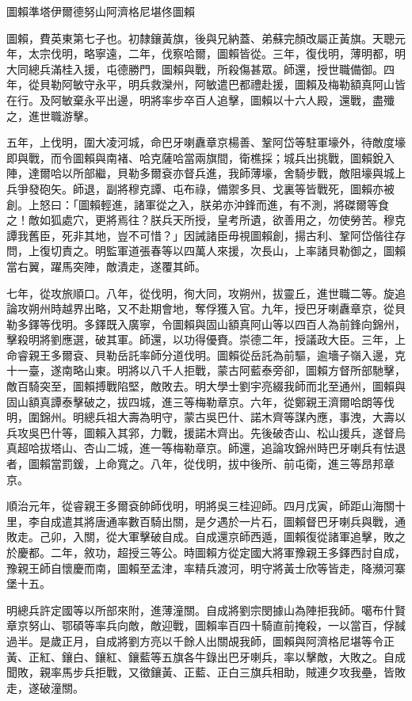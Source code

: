 
\begin{pinyinscope}
圖賴準塔伊爾德努山阿濟格尼堪佟圖賴

圖賴，費英東第七子也。初隸鑲黃旗，後與兄納蓋、弟蘇完顏改屬正黃旗。天聰元年，太宗伐明，略寧遠，二年，伐察哈爾，圖賴皆從。三年，復伐明，薄明都，明大同總兵滿桂入援，屯德勝門，圖賴與戰，所殺傷甚眾。師還，授世職備御。四年，從貝勒阿敏守永平，明兵救灤州，阿敏遣巴都禮赴援，圖賴及梅勒額真阿山皆在行。及阿敏棄永平出邊，明將率步卒百人追擊，圖賴以十六人殿，還戰，盡殲之，進世職游擊。

五年，上伐明，圍大凌河城，命巴牙喇纛章京楊善、鞏阿岱等駐軍壕外，待敵度壕即與戰，而令圖賴與南褚、哈克薩哈當兩旗間，衛樵採；城兵出挑戰，圖賴銳入陣，達爾哈以所部繼，貝勒多爾袞亦督兵進，我師薄壕，舍騎步戰，敵阻壕與城上兵爭發砲矢。師退，副將穆克譚、屯布祿，備禦多貝、戈裏等皆戰死，圖賴亦被創。上怒曰：「圖賴輕進，諸軍從之入，朕弟亦沖鋒而進，有不測，將磔爾等食之！敵如狐處穴，更將焉往？朕兵天所授，皇考所遺，欲善用之，勿使勞苦。穆克譚我舊臣，死非其地，豈不可惜？」因誡諸臣毋視圖賴創，揚古利、鞏阿岱偕往存問，上復切責之。明監軍道張春等以四萬人來援，次長山，上率諸貝勒御之，圖賴當右翼，躍馬突陣，敵潰走，遂覆其師。

七年，從攻旅順口。八年，從伐明，徇大同，攻朔州，拔靈丘，進世職二等。旋追論攻朔州時越界出略，又不赴期會地，奪俘獲入官。九年，授巴牙喇纛章京，從貝勒多鐸等伐明。多鐸既入廣寧，令圖賴與固山額真阿山等以四百人為前鋒向錦州，擊殺明將劉應選，破其軍。師還，以功得優賚。崇德二年，授議政大臣。三年，上命睿親王多爾袞、貝勒岳託率師分道伐明。圖賴從岳託為前驅，逾墻子嶺入邊，克十一臺，遂南略山東。明將以八千人拒戰，蒙古阿藍泰旁卻，圖賴方督所部馳擊，敵百騎突至，圖賴搏戰陷堅，敵敗去。明大學士劉宇亮綴我師而北至通州，圖賴與固山額真譚泰擊破之，拔四城，進三等梅勒章京。六年，從鄭親王濟爾哈朗等伐明，圍錦州。明總兵祖大壽為明守，蒙古吳巴什、諾木齊等謀內應，事洩，大壽以兵攻吳巴什等，圖賴入其郛，力戰，援諾木齊出。先後破杏山、松山援兵，遂督烏真超哈拔塔山、杏山二城，進一等梅勒章京。師還，追論攻錦州時巴牙喇兵有怯退者，圖賴當罰鍰，上命寬之。八年，從伐明，拔中後所、前屯衛，進三等昂邦章京。

順治元年，從睿親王多爾袞帥師伐明，明將吳三桂迎師。四月戊寅，師距山海關十里，李自成遣其將唐通率數百騎出關，是夕遇於一片石，圖賴督巴牙喇兵與戰，通敗走。己卯，入關，從大軍擊破自成。自成還京師西遁，圖賴復從諸軍追擊，敗之於慶都。二年，敘功，超授三等公。時圖賴方從定國大將軍豫親王多鐸西討自成，豫親王師自懷慶而南，圖賴至孟津，率精兵渡河，明守將黃士欣等皆走，降瀕河寨堡十五。

明總兵許定國等以所部來附，進薄潼關。自成將劉宗閔據山為陣拒我師。噶布什賢章京努山、鄂碩等率兵向敵，敵迎戰，圖賴率百四十騎直前掩殺，一以當百，俘馘過半。是歲正月，自成將劉方亮以千餘人出關覘我師，圖賴與阿濟格尼堪等令正黃、正紅、鑲白、鑲紅、鑲藍等五旗各牛錄出巴牙喇兵，率以擊敵，大敗之。自成聞敗，親率馬步兵拒戰，又徵鑲黃、正藍、正白三旗兵相助，賊連夕攻我壘，皆敗走，遂破潼關。


\end{pinyinscope}
